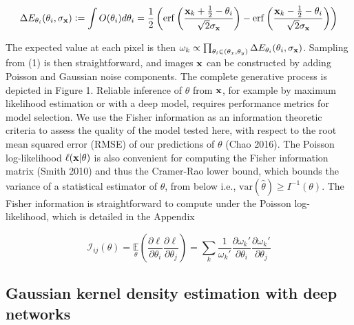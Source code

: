 \documentclass{article}
\begin{document}
\begin{equation}
\Delta E_{\theta_{i}}(\theta_{i},\sigma_{\bold{x}}) \vcentcolon = \int O(\theta_{i})d\theta_{i} = \frac{1}{2}\left(\mathrm{erf}\left(\frac{\bold{x}_{k}+\frac{1}{2}-\theta_{i}}{\sqrt{2}\sigma_{\bold{x}}}\right) -\mathrm{erf}\left(\frac{\bold{x}_{k}-\frac{1}{2}-\theta_{i}}{\sqrt{2}\sigma_{\bold{x}}}\right)\right)
\end{equation}

The expected value at each pixel is then $\omega_{k}\propto \prod_{\theta_{i}\in (\theta_{x},\theta_{y})} \Delta E_{\theta_{i}}(\theta_{i},\sigma_{\bold{x}}) $. Sampling from (1) is then straightforward, and images $\bold{x}$ can be constructed by adding Poisson and Gaussian noise components. The complete generative process is depicted in Figure 1. Reliable inference of $\theta$ from $\bold{x}$, for example by maximum likelihood estimation or with a deep model, requires performance metrics for model selection. We use the Fisher information as an information theoretic criteria to assess the quality of the model tested here, with respect to the root mean squared error (RMSE) of our predictions of $\theta$ (Chao 2016). The Poisson log-likelihood $\ell(\bold{x}|\theta)$ is also convenient for computing the Fisher information matrix (Smith 2010) and thus the Cramer-Rao lower bound, which bounds the variance of a statistical estimator of $\theta$, from below i.e., $\mathrm{var}(\hat{\theta}) \geq I^{-1}(\theta)$. The Fisher information is straightforward to compute under the Poisson log-likelihood, which is detailed in the Appendix

\begin{equation}
\mathcal{I}_{ij}(\theta) = \underset{\theta}{\mathbb{E}}\left(\frac{\partial \ell}{\partial\theta_{i}}\frac{\partial\ell}{\partial\theta_{j}}\right) = \sum_{k}\frac{1}{\omega_{k}'}\frac{\partial \omega_{k}'}{\partial\theta_{i}}\frac{\partial \omega_{k}'}{\partial\theta_{j}}
\end{equation}

\subsection{Gaussian kernel density estimation with deep networks}
\end{document}
